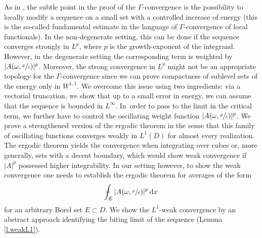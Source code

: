 \documentclass[10pt]{amsart}
\theoremstyle{definition}
\def\Xint#1{\mathchoice
{\XXint\displaystyle\textstyle{#1}}%
{\XXint\textstyle\scriptstyle{#1}}%
{\XXint\scriptstyle\scriptscriptstyle{#1}}%
{\XXint\scriptscriptstyle\scriptscriptstyle{#1}}%
\!\int}
\def\XXint#1#2#3{{\setbox0=\hbox{$#1{#2#3}{\int}$ }
\vcenter{\hbox{$#2#3$ }}\kern-.57\wd0}}
\def\dashint{\Xint-}
\let\e\varepsilon
\let\w\omega
\newcommand{\dx}{\,\mathrm{d}x}
\begin{document}
As in \cite{NSS}, the subtle point in the proof of the $\Gamma$-convergence is the possibility to locally modify a sequence on a small set with a controlled increase of energy (this is the so-called fundamental estimate in the language of $\Gamma$-convergence of local functionals). In the non-degenerate setting, this can be done if the sequence converges strongly in $L^p$, where $p$ is the growth-exponent of the integrand. However, in the degenerate setting the corresponding term is weighted by $|A(\w,\sfrac{x}{\e})|^p$. Moreover, the strong convergence in $L^p$ might not be an appropriate topology for the $\Gamma$-convergence since we can prove compactness of sublevel sets of the energy only in $W^{1,1}$. We overcome this issue using two ingredients: via a vectorial truncation, we show that up to a small error in energy, we can assume that the sequence is bounded in $L^{\infty}$. In~order to pass to the limit in the critical term, we further have to control the oscillating weight function $|A(\w,\sfrac{x}{\e})|^p$. We prove a strengthened version of the ergodic theorem in the sense that this family of oscillating functions converges weakly in $L^1(D)$ for almost every realization. The ergodic theorem yields the convergence when integrating over cubes or, more generally, sets with a decent boundary, which would show weak convergence if $|A|^p$ possessed higher integrability. In our setting however, to show the weak convergence one needs to establish the ergodic theorem for averages of the form
\begin{equation*}
\dashint_E |A(\w,\sfrac{x}{\e})|^p\dx
\end{equation*}
for an arbitrary Borel set $E\subset D$. We show the $L^1$-weak convergence by an abstract approach identifying the biting limit of the sequence (\cf Lemma \ref{l.weakL1}).
\end{document}
